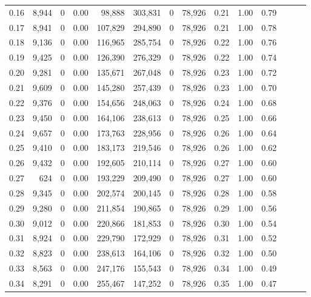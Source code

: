 \begin{tabular}{rrrrrrrrrrrrrr}
0.16 &  8,944 &      0 &  0.00 &   98,888 &  303,831 &       0 &  78,926 &  0.21 &  1.00 &      0.79 \\
0.17 &  8,941 &      0 &  0.00 &  107,829 &  294,890 &       0 &  78,926 &  0.21 &  1.00 &      0.78 \\
0.18 &  9,136 &      0 &  0.00 &  116,965 &  285,754 &       0 &  78,926 &  0.22 &  1.00 &      0.76 \\
0.19 &  9,425 &      0 &  0.00 &  126,390 &  276,329 &       0 &  78,926 &  0.22 &  1.00 &      0.74 \\
0.20 &  9,281 &      0 &  0.00 &  135,671 &  267,048 &       0 &  78,926 &  0.23 &  1.00 &      0.72 \\
0.21 &  9,609 &      0 &  0.00 &  145,280 &  257,439 &       0 &  78,926 &  0.23 &  1.00 &      0.70 \\
0.22 &  9,376 &      0 &  0.00 &  154,656 &  248,063 &       0 &  78,926 &  0.24 &  1.00 &      0.68 \\
0.23 &  9,450 &      0 &  0.00 &  164,106 &  238,613 &       0 &  78,926 &  0.25 &  1.00 &      0.66 \\
0.24 &  9,657 &      0 &  0.00 &  173,763 &  228,956 &       0 &  78,926 &  0.26 &  1.00 &      0.64 \\
0.25 &  9,410 &      0 &  0.00 &  183,173 &  219,546 &       0 &  78,926 &  0.26 &  1.00 &      0.62 \\
0.26 &  9,432 &      0 &  0.00 &  192,605 &  210,114 &       0 &  78,926 &  0.27 &  1.00 &      0.60 \\
0.27 &    624 &      0 &  0.00 &  193,229 &  209,490 &       0 &  78,926 &  0.27 &  1.00 &      0.60 \\
0.28 &  9,345 &      0 &  0.00 &  202,574 &  200,145 &       0 &  78,926 &  0.28 &  1.00 &      0.58 \\
0.29 &  9,280 &      0 &  0.00 &  211,854 &  190,865 &       0 &  78,926 &  0.29 &  1.00 &      0.56 \\
0.30 &  9,012 &      0 &  0.00 &  220,866 &  181,853 &       0 &  78,926 &  0.30 &  1.00 &      0.54 \\
0.31 &  8,924 &      0 &  0.00 &  229,790 &  172,929 &       0 &  78,926 &  0.31 &  1.00 &      0.52 \\
0.32 &  8,823 &      0 &  0.00 &  238,613 &  164,106 &       0 &  78,926 &  0.32 &  1.00 &      0.50 \\
0.33 &  8,563 &      0 &  0.00 &  247,176 &  155,543 &       0 &  78,926 &  0.34 &  1.00 &      0.49 \\
0.34 &  8,291 &      0 &  0.00 &  255,467 &  147,252 &       0 &  78,926 &  0.35 &  1.00 &      0.47 \\

\end{tabular}
